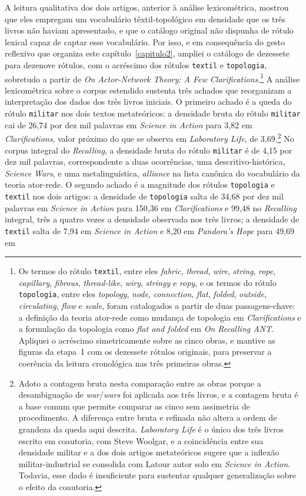 A leitura qualitativa dos dois artigos, anterior à análise lexicométrica, mostrou que eles empregam um vocabulário têxtil-topológico em densidade que os três livros não haviam apresentado, e que o catálogo original não dispunha de rótulo lexical capaz de captar esse vocabulário. Por isso, e em consequência do gesto reflexivo que organiza este capítulo~\ref{capitulo2}, ampliei o catálogo de dezessete para dezenove rótulos, com o acréscimo dos rótulos \texttt{textil} e \texttt{topologia}, sobretudo a partir de \emph{On Actor-Network Theory: A Few Clarifications}.\footnote{Os termos do rótulo \texttt{textil}, entre eles \textit{fabric}, \textit{thread}, \textit{wire}, \textit{string}, \textit{rope}, \textit{capillary}, \textit{fibrous}, \textit{thread-like}, \textit{wiry}, \textit{stringy} e \textit{ropy}, e os termos do rótulo \texttt{topologia}, entre eles \textit{topology}, \textit{node}, \textit{connection}, \textit{flat}, \textit{folded}, \textit{outside}, \textit{circulating}, \textit{flow} e \textit{scale}, foram catalogados a partir de duas passagens-chave: a definição da teoria ator-rede como mudança de topologia em \emph{Clarifications} e a formulação da topologia como \emph{flat and folded} em \emph{On Recalling ANT}. Apliquei o acréscimo simetricamente sobre as cinco obras, e mantive as figuras da etapa~1 com os dezessete rótulos originais, para preservar a coerência da leitura cronológica nas três primeiras obras.} A análise lexicométrica sobre o corpus estendido sustenta três achados que reorganizam a interpretação dos dados dos três livros iniciais. O primeiro achado é a queda do rótulo \texttt{militar} nos dois textos metateóricos: a densidade bruta do rótulo \texttt{militar} cai de 26,74 por dez mil palavras em \emph{Science in Action} para 3,82 em \emph{Clarifications}, valor próximo do que se observa em \emph{Laboratory Life}, de 3,69.\footnote{Adoto a contagem bruta nesta comparação entre as obras porque a desambiguação de \textit{war}/\textit{wars} foi aplicada aos três livros, e a contagem bruta é a base comum que permite comparar as cinco sem assimetria de procedimento. A diferença entre bruta e refinada não altera a ordem de grandeza da queda aqui descrita. \emph{Laboratory Life} é o único dos três livros escrito em coautoria, com Steve Woolgar, e a coincidência entre sua densidade militar e a dos dois artigos metateóricos sugere que a inflexão militar-industrial se consolida com Latour autor solo em \textit{Science in Action}. Todavia, esse dado é insuficiente para sustentar qualquer generalização sobre o efeito da coautoria.} No corpus integral do \emph{Recalling}, a densidade bruta do rótulo \texttt{militar} é de 4,15 por dez mil palavras, correspondente a duas ocorrências, uma descritivo-histórica, \emph{Science Wars}, e uma metalinguística, \emph{alliance} na lista canônica do vocabulário da teoria ator-rede. O segundo achado é a magnitude dos rótulos \texttt{topologia} e \texttt{textil} nos dois artigos: a densidade de \texttt{topologia} salta de 34,68 por dez mil palavras em \emph{Science in Action} para 150,36 em \emph{Clarifications} e 99,48 no \emph{Recalling} integral, três a quatro vezes a densidade observada nos três livros; a densidade de \texttt{textil} salta de 7,94 em \emph{Science in Action} e 8,20 em \emph{Pandora's Hope} para 49,69 em 